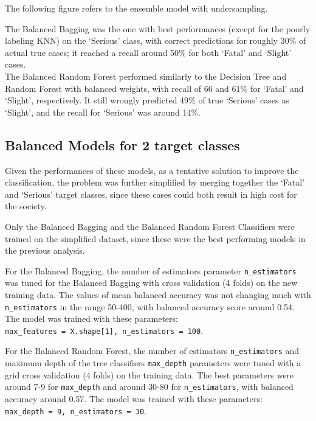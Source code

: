 \documentclass[11pt]{article}
\begin{document}
The following figure refers to the ensemble model with undersampling.

    \begin{center}
    \end{center}

The Balanced Bagging was the one with best performances (except for the poorly labeling KNN) on the `Serious' class, with correct predictions for roughly 30\% of actual true cases; it reached a recall around 50\% for both `Fatal' and `Slight' cases.\\
The Balanced Random Forest performed similarly to the Decision Tree and Random Forest with balanced weights, with recall of 66 and 61\% for `Fatal' and `Slight', respectively. It still wrongly predicted 49\% of true `Serious' cases as `Slight', and the recall for `Serious' was around 14\%.

    \hypertarget{balanced-models-for-2-target-classes}{%
\subsection{Balanced Models for 2 target classes}\label{balanced-models-for-2-target-classes}}

Given the performances of these models, as a tentative solution to improve the classification, the problem was further simplified by merging together the `Fatal' and `Serious' target classes, since these cases could both result in high cost for the society.

Only the Balanced Bagging and the Balanced Random Forest Classifiers were trained on the simplified dataset, since these were the best performing models in the previous analysis.

For the Balanced Bagging, the number of estimators parameter \texttt{n\_estimators} was tuned for the Balanced Bagging with cross validation (4 folds) on the new training data. The values of mean balanced accuracy was not changing much with \texttt{n\_estimators} in the range 50-400, with balanced accuracy score around 0.54. The model was trained with these parameters:\\
\texttt{max\_features = X.shape[1], n\_estimators = 100}.

For the Balanced Random Forest, the number of estimators \texttt{n\_estimators} and maximum depth of the tree classifiers \texttt{max\_depth} parameters were tuned with a grid cross validation (4 folds) on the training data. The best parameters were around 7-9 for \texttt{max\_depth} and around 30-80 for \texttt{n\_estimators}, with balanced accuracy around 0.57. The model was trained with these parameters:\\
\texttt{max\_depth = 9, n\_estimators = 30}.
\end{document}
